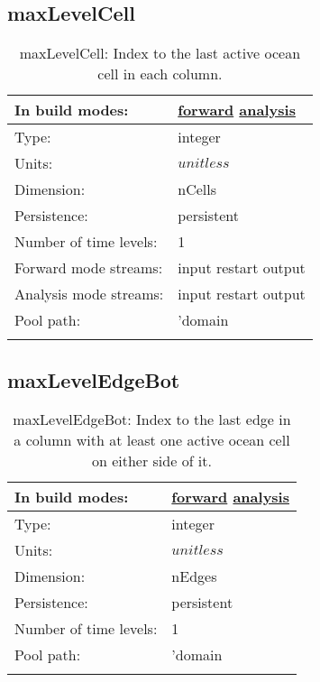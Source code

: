 \subsection[maxLevelCell]{maxLevelCell}
\label{subsec:var_sec_mesh_maxLevelCell}
\begin{center}
\begin{longtable}{| p{2.0in} | p{4.0in} |}
        \hline 
        In build modes: & \hyperref[subsec:forward_var_tab_mesh]{forward} \hyperref[subsec:analysis_var_tab_mesh]{analysis} \\
        \hline 
        Type: & integer \\
        \hline 
        Units: & $unitless$ \\
        \hline 
        Dimension: & nCells \\
        \hline 
        Persistence: & persistent \\
        \hline 
        Number of time levels: & 1 \\
        \hline 
		 Forward mode streams: &  input restart output \\
        \hline 
		 Analysis mode streams: &  input restart output \\
        \hline 
            Pool path: & 'domain %
 \\
		 \hline 
    \caption{maxLevelCell: Index to the last active ocean cell in each column.}
\end{longtable}
\end{center}
\subsection[maxLevelEdgeBot]{maxLevelEdgeBot}
\label{subsec:var_sec_mesh_maxLevelEdgeBot}
\begin{center}
\begin{longtable}{| p{2.0in} | p{4.0in} |}
        \hline 
        In build modes: & \hyperref[subsec:forward_var_tab_mesh]{forward} \hyperref[subsec:analysis_var_tab_mesh]{analysis} \\
        \hline 
        Type: & integer \\
        \hline 
        Units: & $unitless$ \\
        \hline 
        Dimension: & nEdges \\
        \hline 
        Persistence: & persistent \\
        \hline 
        Number of time levels: & 1 \\
        \hline 
            Pool path: & 'domain %
 \\
		 \hline 
    \caption{maxLevelEdgeBot: Index to the last edge in a column with at least one active ocean cell on either side of it.}
\end{longtable}
\end{center}
